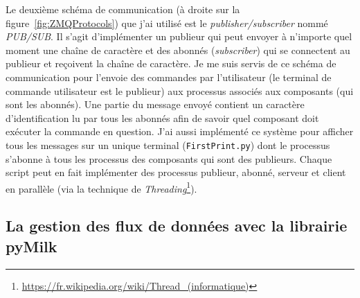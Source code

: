 Le deuxième schéma de communication (à droite sur la figure~\ref{fig:ZMQProtocols}) que j'ai utilisé est le \textit{publisher/subscriber} nommé \textit{PUB/SUB}. Il s'agit d'implémenter un publieur qui peut envoyer à n'importe quel moment une chaîne de caractère et des abonnés (\textit{subscriber}) qui se connectent au publieur et reçoivent la chaîne de caractère. Je me suis servis de ce schéma de communication pour l'envoie des commandes par l'utilisateur (le terminal de commande utilisateur est le publieur) aux processus associés aux composants (qui sont les abonnés). Une partie du message envoyé contient un caractère d'identification lu par tous les abonnés afin de savoir quel composant doit exécuter la commande en question. J'ai aussi implémenté ce système pour afficher tous les messages sur un unique terminal (\texttt{FirstPrint.py}) dont le processus s'abonne à tous les processus des composants qui sont des publieurs. Chaque script peut en fait implémenter des processus publieur, abonné, serveur et client en parallèle (via la technique de \textit{Threading}\footnote{\url{https://fr.wikipedia.org/wiki/Thread_(informatique)}}).


\subsection{La gestion des flux de données avec la librairie pyMilk}
\label{sec:SHM}


